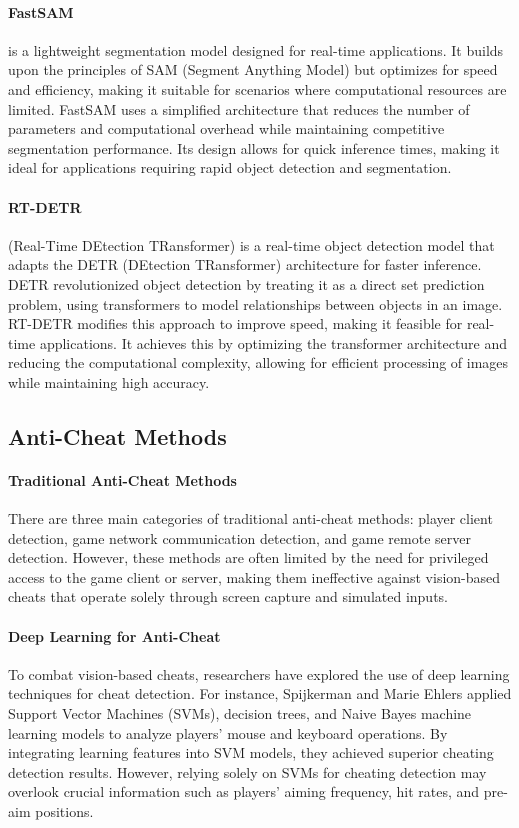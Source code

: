\documentclass{article}
\begin{document}
\paragraph{FastSAM} \cite{zhao2023fast} is a lightweight segmentation model designed for real-time applications. It builds upon the principles of SAM (Segment Anything Model) but optimizes for speed and efficiency, making it suitable for scenarios where computational resources are limited. FastSAM uses a simplified architecture that reduces the number of parameters and computational overhead while maintaining competitive segmentation performance. Its design allows for quick inference times, making it ideal for applications requiring rapid object detection and segmentation.

\paragraph{RT-DETR} \cite{lv2023detrs} (Real-Time DEtection TRansformer) is a real-time object detection model that adapts the DETR (DEtection TRansformer) architecture for faster inference. DETR revolutionized object detection by treating it as a direct set prediction problem, using transformers to model relationships between objects in an image. RT-DETR modifies this approach to improve speed, making it feasible for real-time applications. It achieves this by optimizing the transformer architecture and reducing the computational complexity, allowing for efficient processing of images while maintaining high accuracy.


\subsection{Anti-Cheat Methods}

\paragraph{Traditional Anti-Cheat Methods} There are three main categories of traditional anti-cheat methods: player client detection, game network communication detection, and game remote server detection. However, these methods are often limited by the need for privileged access to the game client or server, making them ineffective against vision-based cheats that operate solely through screen capture and simulated inputs.

\paragraph{Deep Learning for Anti-Cheat} To combat vision-based cheats, researchers have explored the use of deep learning techniques for cheat detection. For instance, Spijkerman and Marie Ehlers \cite{10.1145/3440840.3440857} applied Support Vector Machines (SVMs), decision trees, and Naive Bayes machine learning models to analyze players' mouse and keyboard operations. By integrating learning features into SVM models, they achieved superior cheating detection results. However, relying solely on SVMs for cheating detection may overlook crucial information such as players' aiming frequency, hit rates, and pre-aim positions.
\end{document}
